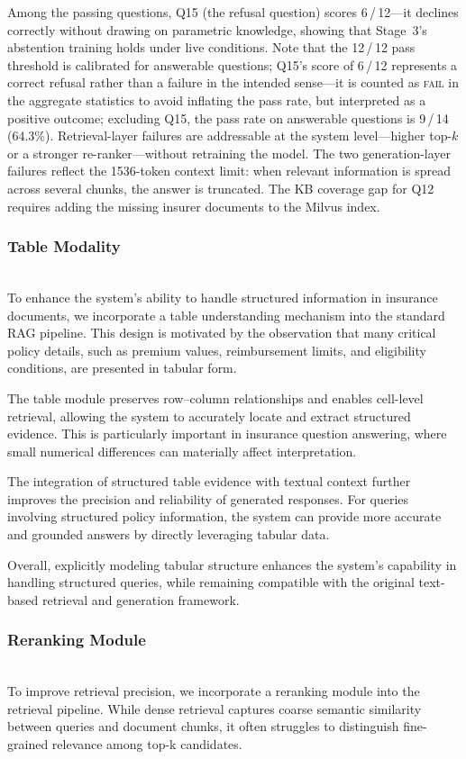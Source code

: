 \documentclass[10pt,conference]{IEEEtran}
\begin{document}
Among the passing questions, Q15 (the refusal question) scores 6\,/\,12---it
declines correctly without drawing on parametric knowledge, showing that
Stage~3's abstention training holds under live conditions.
Note that the 12\,/\,12 pass threshold is calibrated for answerable questions;
Q15's score of 6\,/\,12 represents a correct refusal rather than a failure in
the intended sense---it is counted as \textsc{fail} in the aggregate statistics
to avoid inflating the pass rate, but interpreted as a positive outcome;
excluding Q15, the pass rate on answerable questions is 9\,/\,14 (64.3\%).
Retrieval-layer failures are addressable at the system level---higher top-$k$
or a stronger re-ranker---without retraining the model.
The two generation-layer failures reflect the 1536-token context limit: when
relevant information is spread across several chunks, the answer is truncated.
The KB coverage gap for Q12 requires adding the missing insurer documents to
the Milvus index.

\subsubsection{Table Modality}
\leavevmode\\
To enhance the system's ability to handle structured information in insurance documents, we incorporate a table understanding mechanism into the standard RAG pipeline. This design is motivated by the observation that many critical policy details, such as premium values, reimbursement limits, and eligibility conditions, are presented in tabular form.

The table module preserves row–column relationships and enables cell-level retrieval, allowing the system to accurately locate and extract structured evidence. This is particularly important in insurance question answering, where small numerical differences can materially affect interpretation.

The integration of structured table evidence with textual context further improves the precision and reliability of generated responses. For queries involving structured policy information, the system can provide more accurate and grounded answers by directly leveraging tabular data.

Overall, explicitly modeling tabular structure enhances the system's capability in handling structured queries, while remaining compatible with the original text-based retrieval and generation framework.

\subsubsection{Reranking Module}
\leavevmode\\
To improve retrieval precision, we incorporate a reranking module into the retrieval pipeline. While dense retrieval captures coarse semantic similarity between queries and document chunks, it often struggles to distinguish fine-grained relevance among top-k candidates.
\end{document}
